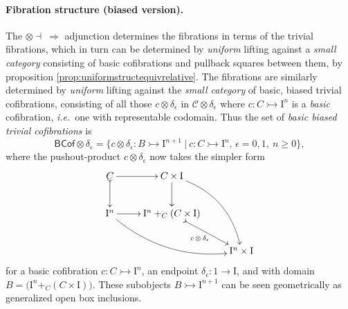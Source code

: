 \documentclass[11pt]{amsart}
\newcommand{\ie}{\emph{i.e.}}
\newcommand{\mono}{\ensuremath{\rightarrowtail}}
\newcommand{\ra}{\ensuremath{\rightarrow}}
\newcommand{\I}{\ensuremath{\mathrm{I}}}
\theoremstyle{remark}
\theoremstyle{definition}
\begin{document}
\paragraph{Fibration structure (biased version).}
The $\otimes\dashv\ \Rightarrow$ adjunction determines the fibrations in terms of the trivial fibrations, which in turn can be determined by \emph{uniform} lifting against a \emph{small category} consisting of basic cofibrations and pullback squares between them, by proposition \ref{prop:uniformstructequivrelative}.  The fibrations are similarly determined by \emph{uniform} lifting against the \emph{small category} of basic, biased trivial cofibrations, consisting of all those $c \otimes \delta_\epsilon$ in $\mathcal{C}\otimes \delta_\epsilon$ where $c : C \mono \I^n$ is a \emph{basic} cofibration, \ie\ one with representable codomain.  
Thus the set of \emph{basic biased trivial cofibrations} is
\begin{equation}\label{eq:basicTCof}
\mathsf{BCof}\otimes \delta_\epsilon = \{c \otimes \delta_\epsilon : B \mono \I^{n+1}\ |\ c : C\mono \I^n,\,\epsilon = 0,1,\ n\geq 0 \},
\end{equation}
where the pushout-product $c\otimes\delta_\epsilon$ now takes the simpler form
\begin{equation}\label{diagram:basicpushoutproduct}
\xymatrix{
C \ar@{>->}[d] \ar[r] & C\times \I \ar[d] \ar@/^4ex/ [rdd]\\
\I^{n} \ar@/_4ex/ [rrd] \ar[r] &  \I^n +_C (C\times\I) \ar@{>->}[rd]_{c\, \otimes\, \delta_\epsilon} \\
&& \I^{n}\times\I
}
\end{equation}
for a basic cofibration $c : C\mono \I^n$, an endpoint $\delta_\epsilon:1 \ra \I$, and with domain $B = \big(\I^n +_C (C\times\I)\big)$.   These subobjects $B \mono \I^{n+1}$ can be seen geometrically as generalized open box inclusions.
\end{document}
